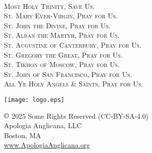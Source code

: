 \checkoddpage
\ifoddpage \thispagestyle{empty}
~\clearpage\fi
\fancyhead[RE,LO]{}\fancyhead[RO,LE]{}\fancyhead[C]{}\thispagestyle{empty}
   \begin{center}
   	{\scshape
   	{\large Most Holy Trinity, Save Us.}\\
   	
   	St. Mary Ever-Virgin, Pray for Us.\\
   	St. John the Divine, Pray for Us.\\
   	St. Alban the Martyr, Pray for Us.\\
   	St. Augustine of Canterbury, Pray for Us.\\
    St. Gregory the Great, Pray for Us.\\
    St. Tikhon of Moscow, Pray for Us.\\
    St. John of San Francisco, Pray for Us.\\
   	All Ye Holy Angels \& Saints, Pray for Us.}
   	\vfill
   	
   	\texttt{[image: logo.eps]}
			\par
	$\copyright$ 2025 Some Rights Reserved (CC-BY-SA-4.0)\\
	Apologia Anglicana, LLC\\
    Boston, MA\\
	\url{www.ApologiaAnglicana.org}
   \end{center}